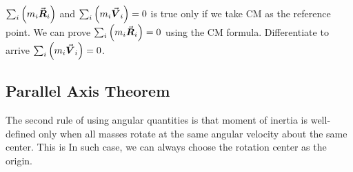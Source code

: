 \documentclass[class=article, crop=false, 12pt]{standalone}
\begin{document}
\hfill\\
\begin{notation}[]
    \\

    $\sum_i\qty(m_i\va*{R}_i)$ and $\sum_i\qty(m_i\va*{V}_i) = 0 $ is true only if we take CM as the reference point. 
    We can prove $\sum_i\qty(m_i\va*{R}_i) = 0$ using the CM formula.
    Differentiate to arrive $\sum_i\qty(m_i\va*{V}_i) = 0$.
\end{notation}




\subsection{Parallel Axis Theorem}

The second rule of using angular quantities is that moment of inertia is well-defined
only when all masses rotate at the same angular velocity about the same center.
This is 
In such case, we can always choose the rotation center as the origin. 

\end{document}
